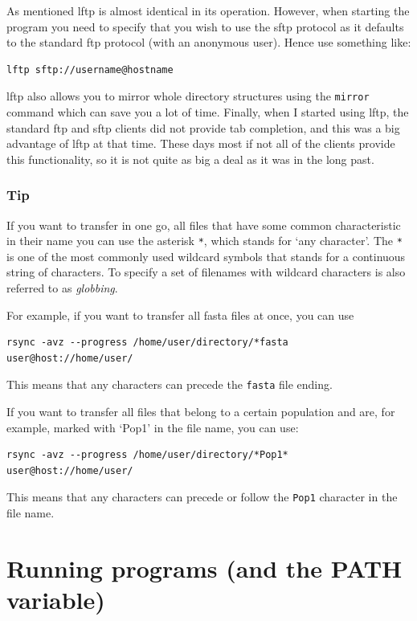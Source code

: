 \documentclass[11pt]{article}
\begin{document}
As mentioned lftp is almost identical in its operation. However, when
starting the program you need to specify that you wish to use the sftp
protocol as it defaults to the standard ftp protocol (with an anonymous
user). Hence use something like:


\begin{verbatim}
lftp sftp://username@hostname
\end{verbatim}

lftp also allows you to mirror whole directory structures using the
\texttt{mirror} command which can save you a lot of time. Finally, when I
started using lftp, the standard ftp and sftp clients did not provide
tab completion, and this was a big advantage of lftp at that time. These
days most if not all of the clients provide this functionality, so it is
not quite as big a deal as it was in the long past.
\subsubsection{Tip}
\label{sec-2-2-3}


If you want to transfer in one go, all files that have some common
characteristic in their name you can use the asterisk \texttt{*}, which
stands for `any character'. The \texttt{*} is one of the most commonly used
wildcard symbols that stands for a continuous string of characters. To
specify a set of filenames with wildcard characters is also referred
to as \emph{globbing}.

For example, if you want to transfer all
fasta files at once, you can use


\begin{verbatim}
rsync -avz --progress /home/user/directory/*fasta user@host://home/user/
\end{verbatim}
This means that any characters can precede the \texttt{fasta} file ending.



If you want to transfer all files that belong to a certain population
and are, for example, marked with `Pop1' in the file name, you can use:


\begin{verbatim}
rsync -avz --progress /home/user/directory/*Pop1* user@host://home/user/
\end{verbatim}
This means that any characters can precede or follow the \texttt{Pop1}
character in the file name.
\section{Running programs (and the PATH variable)}
\label{sec-3}
\end{document}
